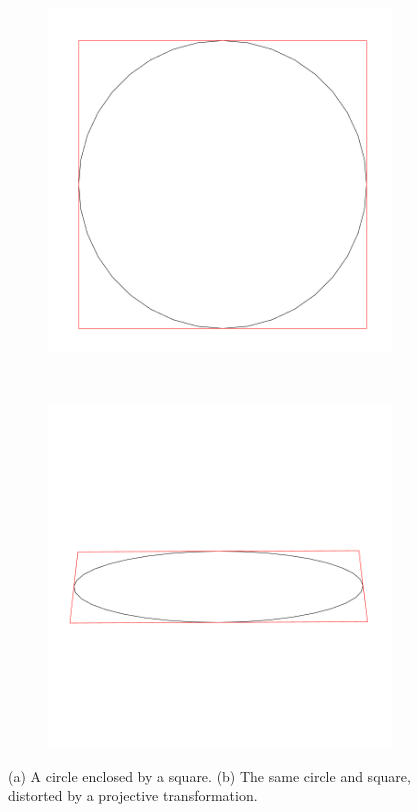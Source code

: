 \begin{figure}
	\centering
	\begin{subfigure}[b]{0.4\textwidth}
		\includegraphics[width=\textwidth]{figures/circle.png}
		\caption{}
		\label{fig:circle}
	\end{subfigure}
	~~~
	\begin{subfigure}[b]{0.4\textwidth}
		\includegraphics[width=\textwidth]{figures/circle_perspective.png}
		\caption{}
		\label{fig:circle_perspective}
	\end{subfigure}
		\caption[Example of perspective distortion on geometric shapes]{(a) A circle enclosed by a square. (b) The same circle and square, distorted by a projective transformation.}\label{fig:perspective}
\end{figure}